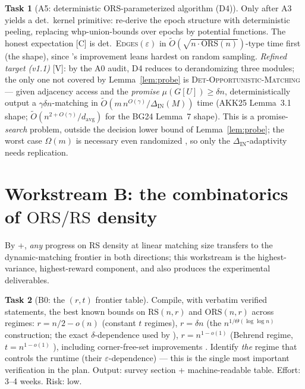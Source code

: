 \documentclass[11pt]{article}
\theoremstyle{definition}
\newtheorem{task}{Task}
\theoremstyle{remark}
\newcommand{\statusV}{\textcolor{green!45!black}{\textsf{[V]}}}
\newcommand{\statusC}{\textcolor{red!70!black}{\textsf{[C]}}}
\newcommand{\ORS}{\mathrm{ORS}}
\newcommand{\RS}{\mathrm{RS}}
\newcommand{\eps}{\varepsilon}
\newcommand{\Otil}{\widetilde{O}}
\begin{document}
\begin{task}[A5: deterministic ORS-parameterized algorithm (D4)]
\label{task:d4}
Only after A3 yields a det.\ kernel primitive: re-derive the
\cite{AKK25} epoch structure with deterministic peeling, replacing
whp-union-bounds over epochs by potential functions. The honest
expectation \statusC{} is det.\ \textsc{Edges}$(\eps)$ in
$\Otil(\sqrt{n\cdot\ORS(n)})$-type time first (the \cite{BG24} shape),
since \cite{AKK25}'s improvement leans hardest on random sampling.
\emph{Refined target (v1.1)} \statusV{}: by the A0 audit, D4 reduces
to derandomizing three modules; the only one not covered by
Lemma~\ref{lem:probe} is \textsc{Det-Opportunistic-Matching} ---
given adjacency access and the \emph{promise} $\mu(G[U])\ge\delta
n$, deterministically output a $\gamma\delta n$-matching in
$\Otil(m\,n^{O(\gamma)}/\Delta_{\mathrm{IN}}(M))$ time (AKK25
Lemma~3.1 shape; $\Otil(n^{2+O(\gamma)}/d_{\mathrm{avg}})$ for the
BG24 Lemma~7 shape). This is a promise-\emph{search} problem, outside
the decision lower bound of Lemma~\ref{lem:probe}; the worst case
$\Omega(m)$ is necessary even randomized \cite{ACK19}, so only the
$\Delta_{\mathrm{IN}}$-adaptivity needs replication.
\end{task}

\section{Workstream B: the combinatorics of \texorpdfstring{$\ORS/\RS$}{ORS/RS} density}
\label{sec:wsB}

By \cite{AKK25}+\cite{Pra26}, \emph{any} progress on RS density at linear
matching size transfers to the dynamic-matching frontier in both
directions; this workstream is the highest-variance, highest-reward
component, and also produces the experimental deliverables.

\begin{task}[B0: the $(r,t)$ frontier table]\label{task:rs-table}
Compile, with verbatim verified statements, the best known bounds on
$\RS(n,r)$ and $\ORS(n,r)$ across regimes: $r=n/2-o(n)$ (constant $t$
regimes), $r=\delta n$ (the \cite{FLNRRS02} $n^{1/\Theta(\log\log n)}$
construction; the exact $\delta$-dependence used by \cite{AKK25}),
$r=n^{1-o(1)}$ (Behrend regime, $t=n^{1-o(1)}$
\cite{Beh46,RS78}), including corner-free-set improvements
\cite{CFTZ22}. Identify \emph{the} regime that controls the
\cite{AKK25} runtime (their $\eps$-dependence) --- this is the
single most important verification in the plan. Output: survey
section + machine-readable table. Effort: 3--4 weeks. Risk: low.
\end{task}
\end{document}
